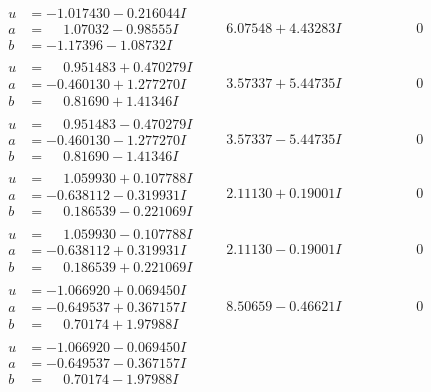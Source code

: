 \documentclass[1p]{elsarticle_modified}
\theoremstyle{definition}
\begin{document}
$$\begin{array}{c|c|c}
\begin{aligned}
u &= -1.017430 - 0.216044 I \\
a &= \phantom{-}1.07032 - 0.98555 I \\
b &= -1.17396 - 1.08732 I\end{aligned}
 & \phantom{-}6.07548 + 4.43283 I & \phantom{-0.000000 } 0 \\ \hline\begin{aligned}
u &= \phantom{-}0.951483 + 0.470279 I \\
a &= -0.460130 + 1.277270 I \\
b &= \phantom{-}0.81690 + 1.41346 I\end{aligned}
 & \phantom{-}3.57337 + 5.44735 I & \phantom{-0.000000 } 0 \\ \hline\begin{aligned}
u &= \phantom{-}0.951483 - 0.470279 I \\
a &= -0.460130 - 1.277270 I \\
b &= \phantom{-}0.81690 - 1.41346 I\end{aligned}
 & \phantom{-}3.57337 - 5.44735 I & \phantom{-0.000000 } 0 \\ \hline\begin{aligned}
u &= \phantom{-}1.059930 + 0.107788 I \\
a &= -0.638112 - 0.319931 I \\
b &= \phantom{-}0.186539 - 0.221069 I\end{aligned}
 & \phantom{-}2.11130 + 0.19001 I & \phantom{-0.000000 } 0 \\ \hline\begin{aligned}
u &= \phantom{-}1.059930 - 0.107788 I \\
a &= -0.638112 + 0.319931 I \\
b &= \phantom{-}0.186539 + 0.221069 I\end{aligned}
 & \phantom{-}2.11130 - 0.19001 I & \phantom{-0.000000 } 0 \\ \hline\begin{aligned}
u &= -1.066920 + 0.069450 I \\
a &= -0.649537 + 0.367157 I \\
b &= \phantom{-}0.70174 + 1.97988 I\end{aligned}
 & \phantom{-}8.50659 - 0.46621 I & \phantom{-0.000000 } 0 \\ \hline\begin{aligned}
u &= -1.066920 - 0.069450 I \\
a &= -0.649537 - 0.367157 I \\
b &= \phantom{-}0.70174 - 1.97988 I\end{aligned}

\end{array}$$
\end{document}
